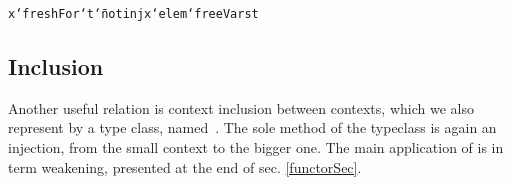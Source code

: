 \documentclass[9pt,preprint,authoryear]{sigplanconf}
\begin{document}
{{{}\vphantom{$\{$}}}\textcolor[rgb]{0,0,0.80}{\texttt{x}}\textcolor[rgb]{0,0,0.80}{\texttt{\mbox{\hspace{0.50em}}}}\textcolor[rgb]{0,0,0.80}{\texttt{{`}freshFor{`}}}\textcolor[rgb]{0,0,0.80}{\texttt{\mbox{\hspace{0.50em}}}}\textcolor[rgb]{0,0,0.80}{\texttt{t}}\textcolor[rgb]{0,0,0.80}{\texttt{\mbox{\hspace{0.50em}}}}\textcolor[cmyk]{0,0.65,0.99,0}{\texttt{{\char `\=}}}\textcolor[rgb]{0,0,0.80}{\texttt{\mbox{\hspace{0.50em}}}}\textcolor[rgb]{0,0,0.80}{\texttt{not}}\textcolor[rgb]{0,0,0.80}{\texttt{\mbox{\hspace{0.50em}}}}\textcolor[cmyk]{0,0.65,0.99,0}{\texttt{\makebox[1.22ex][l]{$ {(} $}}}\textcolor[rgb]{0,0,0.80}{\texttt{inj}}\textcolor[rgb]{0,0,0.80}{\texttt{\mbox{\hspace{0.50em}}}}\textcolor[rgb]{0,0,0.80}{\texttt{x}}\textcolor[rgb]{0,0,0.80}{\texttt{\mbox{\hspace{0.50em}}}}\textcolor[rgb]{0,0,0.80}{\texttt{{`}elem{`}}}\textcolor[rgb]{0,0,0.80}{\texttt{\mbox{\hspace{0.50em}}}}\textcolor[rgb]{0,0,0.80}{\texttt{freeVars}}\textcolor[rgb]{0,0,0.80}{\texttt{\mbox{\hspace{0.50em}}}}\textcolor[rgb]{0,0,0.80}{\texttt{t}}\textcolor[cmyk]{0,0.65,0.99,0}{\texttt{\makebox[1.22ex][r]{$ {)} $}}}\textcolor[rgb]{0,0,0.80}{\texttt{{\nopagebreak \newline%
}\vphantom{$\{$}}}%


\subsection{Inclusion}

%
Another useful relation is context inclusion between contexts, which we also
    represent by a type class, named{~}\textcolor[rgb]{0,0,0.80}{\texttt{\makebox[1.83ex][c]{$ \subseteq $}}}. The sole method of the
    typeclass is again an injection, from the small context to the
    bigger one. The main application of \textcolor[rgb]{0,0,0.80}{\texttt{\makebox[1.83ex][c]{$ \subseteq $}}} is in term weakening,
    presented at the end of sec. \ref{functorSec}.%


{\nopagebreak }
\end{document}
